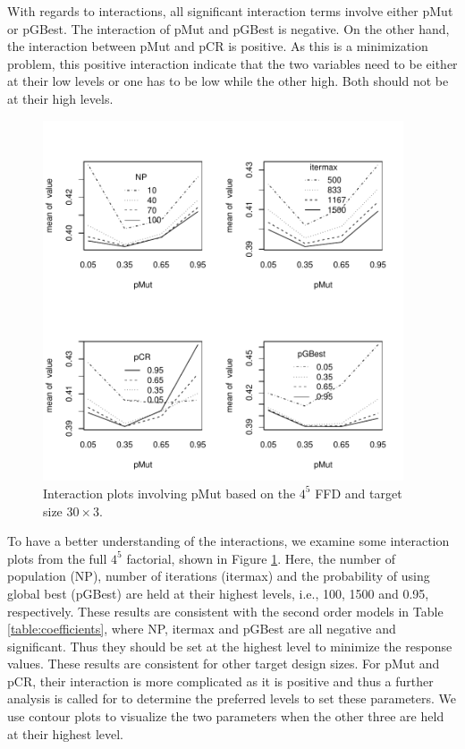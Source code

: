 \documentclass [PhD] {package/uclathes}
\begin{document}
With regards to interactions, all significant interaction terms involve either pMut or pGBest. The interaction of pMut and pGBest is negative. On the other hand, the interaction between pMut and pCR is positive. As this is a minimization problem, this positive interaction indicate that the two variables need to be either at their low levels or one has to be low while the other high. Both should not be at their high levels.


\begin{figure}
\centering
\includegraphics[width=0.95\textwidth]{chapters/DE/pdfs/interactions}
\caption{Interaction plots involving pMut based on the $4^5$ FFD and target size $30\times3$.}
\label{interaction}
\end{figure}


To have a better understanding of the interactions, we examine some interaction plots from the full $4^5$  factorial, shown in Figure \ref{interaction}. Here, the number of population (NP), number of iterations (itermax) and the probability of using global best (pGBest) are held at their highest levels, i.e., 100, 1500 and 0.95, respectively. These results are consistent with the second order models in Table \ref{table:coefficients}, where NP, itermax and pGBest are all negative and significant. Thus they should be set at the highest level to minimize the response values. These results are consistent for other target design sizes. For pMut and pCR, their interaction is more complicated as it is positive and thus a further analysis is called for to determine the preferred levels to set these parameters. We use contour plots to visualize the two parameters when the other three are held at their highest level.
\end{document}
